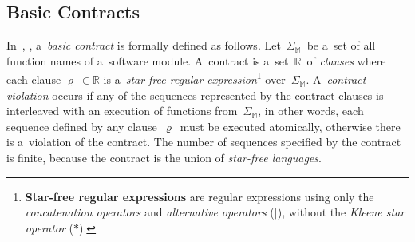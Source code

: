 \subsection{Basic Contracts}
\label{sec:basicContracts}

In~\cite{contracts2017}, \cite{contracts2015}, a~\emph{basic contract} is
formally defined as follows. Let~$ \Sigma_\mathbb{M} $~be a~set of all
function names of a~software module. A~contract is
a~set~$ \mathbb{R} $~of \emph{clauses} where each clause
$ \varrho\ \in \mathbb{R} $ is a~\emph{star-free regular
expression}\footnote{\textbf{Star-free regular expressions} are
regular expressions using only the \emph{concatenation operators}
and \emph{alternative operators} ($ | $), without the
\emph{Kleene star operator} ($ * $).} over~$ \Sigma_\mathbb{M} $.
A~\emph{contract violation} occurs if any of the sequences represented by
the contract clauses is interleaved with an execution of functions
from~$ \Sigma_\mathbb{M} $, in other words, each sequence defined by
any clause~$ \varrho $~must be executed atomically, otherwise there
is a~violation of the contract. The number of sequences specified by
the contract is finite, because the contract is the union of
\emph{star-free languages}.

